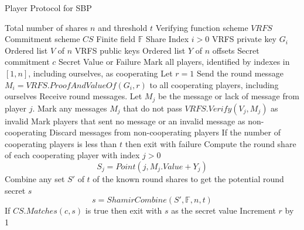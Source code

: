 \documentclass{dalcsthesis}
\begin{document}
\begin{algorithm}
  \caption{Player Protocol for SBP}
  \label{alg:SBP:Player}
  \begin{algorithmic}
    \INPUT Total number of shares $n$ and threshold $t$
    \INPUT Verifying function scheme $VRFS$
    \INPUT Commitment scheme $CS$
    \INPUT Finite field $\mathbb{F}$
    \INPUT Share Index $i > 0$
    \INPUT VRFS private key $G_i$
    \INPUT Ordered list $V$ of $n$ VRFS public keys
    \INPUT Ordered list $Y$ of $n$ offsets
    \INPUT Secret commitment $c$
    \OUTPUT Secret Value or Failure
    \STATE Mark all players, identified by indexes in $[1, n]$, including ourselves, as cooperating
    \STATE Let $r = 1$
      \STATE Send the round message $M_i = VRFS.ProofAndValueOf(G_i, r)$ to all cooperating players, including ourselves
      \STATE Receive round messages. Let $M_j$ be the message or lack of message from player $j$.
      \STATE Mark any messages $M_j$ that do not pass $VRFS.Verify(V_j, M_j)$ as invalid
      \STATE Mark players that sent no message or an invalid message as non-cooperating
      \STATE Discard messages from non-cooperating players
      \STATE If the number of cooperating players is less than $t$ then exit with failure
      \STATE Compute the round share of each cooperating player with index $j > 0$
			$$S_j = Point(j, M_j.Value + Y_j)$$
      \STATE Combine any set $S'$ of $t$ of the known round shares to get the potential round secret $s$
      		$$s = ShamirCombine(S', \mathbb{F}, n, t)$$
      \STATE If $CS.Matches(c, s)$ is true then exit with $s$ as the secret value
      \STATE Increment $r$ by 1
    \ENDWHILE
  \end{algorithmic}
\end{algorithm}
\end{document}
